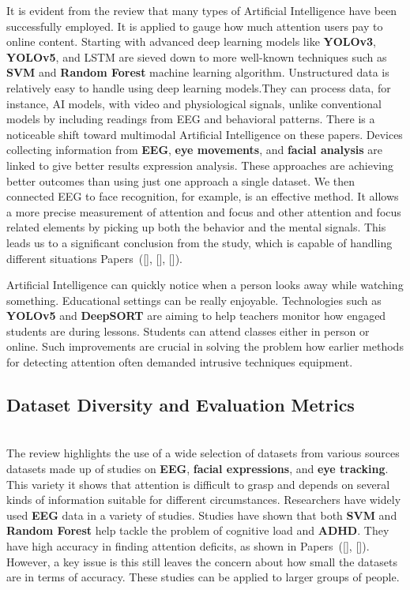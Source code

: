 \documentclass[twocolumn,12pt]{article}
\begin{document}
{It is evident from the review that many types of Artificial Intelligence have been successfully employed.
It is applied to gauge how much attention users pay to online content. Starting with advanced deep learning models like
\textbf{YOLOv3}, \textbf{YOLOv5}, and LSTM are sieved down to more well-known techniques such as \textbf{SVM} and \textbf{Random Forest} machine learning algorithm. Unstructured data is relatively easy to handle using deep learning models.They can process data, for instance, AI models, with video and physiological signals, unlike conventional models by including readings from EEG and behavioral patterns.
There is a noticeable shift toward multimodal Artificial Intelligence on these papers. Devices collecting information from \textbf{EEG}, \textbf{eye movements}, and \textbf{facial analysis} are linked to give better results expression analysis. These approaches are achieving better outcomes than using just one approach a single dataset. We then connected EEG to face recognition, for example, is an effective method. It allows a more precise measurement of attention and focus and other attention and focus related elements by picking up both the behavior and the mental signals. This leads us to a significant conclusion from the study, which is capable of handling different situations Papers~([\citealp{ref1}], [\citealp{ref7}], [\citealp{ref16}]).

Artificial Intelligence can quickly notice when a person looks away while watching something. Educational settings can be really enjoyable. Technologies such as \textbf{YOLOv5} and  \textbf{DeepSORT} are aiming to help teachers monitor how engaged students are during lessons. Students can attend classes either in person or online. Such improvements are crucial in solving the problem how earlier methods for detecting attention often demanded intrusive techniques equipment.

\subsection{ Dataset Diversity and Evaluation Metrics} \\

The review highlights the use of a wide selection of datasets from various sources datasets made up of studies on \textbf{EEG}, \textbf{facial expressions}, and \textbf{eye tracking}. This variety it shows that attention is difficult to grasp and depends on several kinds of information suitable for different circumstances. Researchers have widely used \textbf{EEG} data in a variety of studies. Studies have shown that both \textbf{SVM} and \textbf{Random Forest} help tackle the problem of cognitive load and \textbf{ADHD}. They have high accuracy in finding attention deficits, as shown in Papers~([\citealp{ref11}], [\citealp{ref19}]). However, a key issue is this still leaves the concern about how small the datasets are in terms of accuracy. These studies can be applied to larger groups of people.

}
\end{document}
